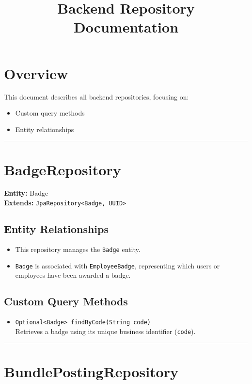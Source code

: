 \documentclass[12pt]{article}
\title{Backend Repository Documentation}
\author{}
\date{}
\begin{document}
\maketitle

\section*{Overview}

This document describes all backend repositories, focusing on:
\begin{itemize}
    \item Custom query methods
    \item Entity relationships
\end{itemize}

\hrule
\vspace{1em}

\section{BadgeRepository}

\textbf{Entity:} Badge \\
\textbf{Extends:} \texttt{JpaRepository<Badge, UUID>}

\subsection*{Entity Relationships}
\begin{itemize}
    \item This repository manages the \texttt{Badge} entity.
    \item \texttt{Badge} is associated with \texttt{EmployeeBadge}, representing which users or employees have been awarded a badge.
\end{itemize}

\subsection*{Custom Query Methods}
\begin{itemize}
    \item \texttt{Optional<Badge> findByCode(String code)} \\
    Retrieves a badge using its unique business identifier (\texttt{code}).
\end{itemize}

\hrule
\vspace{1em}

\section{BundlePostingRepository}
\end{document}
